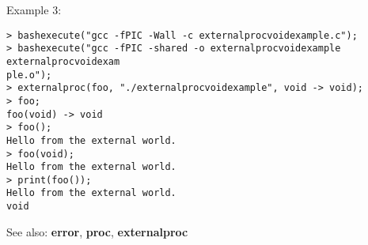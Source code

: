 \noindent Example 3: 
\begin{center}\begin{minipage}{15cm}\begin{Verbatim}[frame=single]
> bashexecute("gcc -fPIC -Wall -c externalprocvoidexample.c");
> bashexecute("gcc -fPIC -shared -o externalprocvoidexample externalprocvoidexam
ple.o");
> externalproc(foo, "./externalprocvoidexample", void -> void);
> foo;
foo(void) -> void
> foo();
Hello from the external world.
> foo(void);
Hello from the external world.
> print(foo());
Hello from the external world.
void
\end{Verbatim}
\end{minipage}\end{center}
See also: \textbf{error}, \textbf{proc}, \textbf{externalproc}
